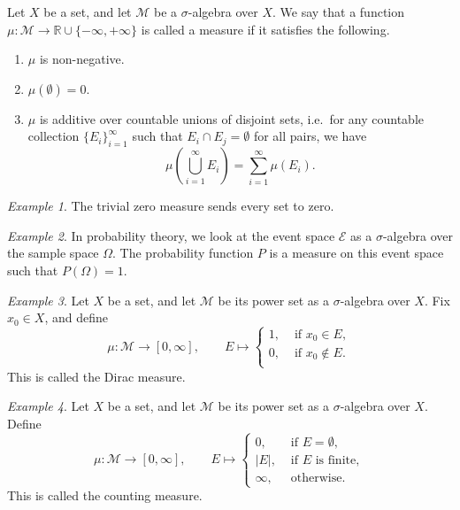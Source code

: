 \documentclass[11pt]{article}
\newcommand{\R}{\mathbb{R}}
\newcommand{\M}{\mathcal{M}}
\theoremstyle{definition}
\theoremstyle{remark}
\newtheorem*{example}{Example}
\numberwithin{equation}{section}
\begin{document}
    \begin{definition}
        Let $X$ be a set, and let $\M$ be a $\sigma$-algebra over $X$. We say
        that a function $\mu\colon \M \to \R \cup \{-\infty, +\infty\}$ is called
        a measure if it satisfies the following.
        \begin{enumerate}
            \itemsep0em
            \item $\mu$ is non-negative.
            \item $\mu(\emptyset) = 0$.
            \item $\mu$ is additive over countable unions of disjoint sets, i.e.\ for
            any countable collection $\{E_i\}_{i = 1}^\infty$ such that $E_i \cap E_j
            = \emptyset$ for all pairs, we have \[
                \mu\left(\bigcup_{i = 1}^\infty E_i\right) = \sum_{i = 1}^\infty
                \mu(E_i).
            \] 
        \end{enumerate}
    \end{definition}

    \begin{example}
        The trivial zero measure sends every set to zero.
    \end{example}
    \begin{example}
        In probability theory, we look at the event space $\mathcal{E}$ as a
        $\sigma$-algebra over the sample space $\Omega$. The probability function $P$
        is a measure on this event space such that $P(\Omega) = 1$.
    \end{example}
    \begin{example}
        Let $X$ be a set, and let $\M$ be its power set as a $\sigma$-algebra
        over $X$. Fix $x_0 \in X$, and define \[
            \mu\colon \M \to [0, \infty], \qquad E \mapsto \begin{cases}
                1, &\text{ if } x_0 \in E, \\
                0, &\text{ if } x_0 \notin E. \\
            \end{cases}
        \] This is called the Dirac measure.
    \end{example}

    \begin{example}
        Let $X$ be a set, and let $\M$ be its power set as a $\sigma$-algebra
        over $X$. Define \[
            \mu\colon \M \to [0, \infty], \qquad E \mapsto \begin{cases}
                0, &\text{ if } E = \emptyset, \\
                |E|, &\text{ if } E\text{ is finite},\\
                \infty, &\text{ otherwise}.
            \end{cases}
        \] This is called the counting measure.
    \end{example}
\end{document}
